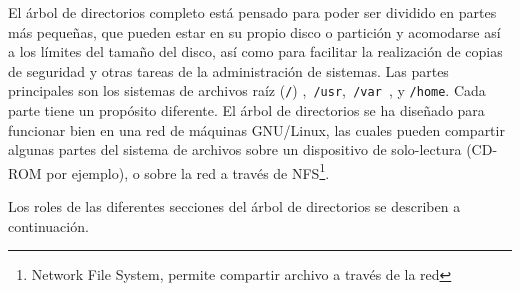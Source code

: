 \documentclass[12pt]{article}
\begin{document}
El árbol de directorios completo está pensado para poder ser dividido en
partes más pequeñas, que pueden estar en su propio disco o partición y
acomodarse así a los límites del tamaño del disco, así como para facilitar la
realización de  copias de seguridad y otras tareas de la administración de
sistemas. Las partes principales son los sistemas de archivos raíz
(\texttt{/}) ,\texttt{ /usr},\texttt{ /var
}, y \texttt{/home}. Cada parte tiene un propósito
diferente. El árbol de directorios se ha diseñado para funcionar bien en una red
de máquinas GNU/Linux, las cuales pueden compartir algunas partes del sistema de
archivos sobre un dispositivo de solo-lectura (CD-ROM por ejemplo), o sobre la
red a través de NFS\footnote{Network File System, permite compartir archivo a través
de la red}.  




 Los roles de las diferentes secciones del árbol de directorios se
describen a continuación.  
\end{document}
